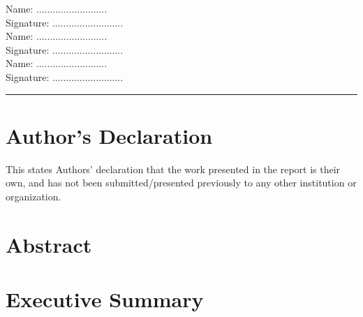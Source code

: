\documentclass{FastFyp}
\begin{document}
\begin{flushright}
Name: ..........................
\\[3ex]
Signature: ..........................
\\[6ex]
Name: ..........................
\\[3ex]
Signature: ..........................
\\[6ex]
Name: ..........................
\\[3ex]
Signature: ..........................

\end{flushright} 

\vspace{5 cm} %
 
\hrule %

\section*{Author's Declaration}
This states Authors’ declaration that the work presented in the report is their own, and has not been submitted/presented previously to any other institution or organization.
\pagebreak
\section*{Abstract}
%
\pagebreak 

\section*{Executive Summary}
%
\pagebreak


\pagestyle{fancy} %
\tableofcontents

\pagebreak
\listoffigures	%
\pagebreak
\listoftables %

\mainmatter


%
%
%
%
%
%
{

}
\appendix
%
\end{document}
